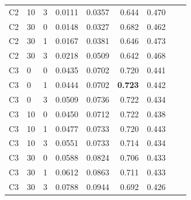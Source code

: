 \documentclass[pdflatex,sn-mathphys-num]{sn-jnl}%
\theoremstyle{thmstyleone}%
\theoremstyle{thmstyletwo}%
\theoremstyle{thmstylethree}%
\begin{document}
\begin{appendices}
\begin{table}
\begin{tabular}{llrrrrrrr}
C2 & 10 & 3 & 0.0111 & 0.0357 & 0.644 & 0.470 \\
C2 & 30 & 0 & 0.0148 & 0.0327 & 0.682 & 0.462 \\
C2 & 30 & 1 & 0.0167 & 0.0381 & 0.646 & 0.473 \\
C2 & 30 & 3 & 0.0218 & 0.0509 & 0.642 & 0.468 \\
\addlinespace[4pt]
C3 & 0 & 0 & 0.0435 & 0.0702 & 0.720 & 0.441 \\
C3 & 0 & 1 & 0.0444 & 0.0702 & \textbf{0.723} & 0.442 \\
C3 & 0 & 3 & 0.0509 & 0.0736 & 0.722 & 0.434 \\
C3 & 10 & 0 & 0.0450 & 0.0712 & 0.722 & 0.438 \\
C3 & 10 & 1 & 0.0477 & 0.0733 & 0.720 & 0.443 \\
C3 & 10 & 3 & 0.0551 & 0.0733 & 0.714 & 0.434 \\
C3 & 30 & 0 & 0.0588 & 0.0824 & 0.706 & 0.433 \\
C3 & 30 & 1 & 0.0612 & 0.0863 & 0.711 & 0.433 \\
C3 & 30 & 3 & 0.0788 & 0.0944 & 0.692 & 0.426 \\
\bottomrule
\end{tabular}
\end{table}


\end{appendices}
\end{document}
